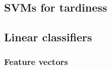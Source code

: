 \documentclass[11pt]{article} %
\begin{document}
%

\subsection{SVMs for tardiness}
\label{sec:svms_tardiness}
  
% 
%  
% 
% 
% 
% 

\subsection{Linear classifiers}
\label{sec:lcs}
% 

\subsubsection{Feature vectors}
\label{sec:feature_vecs}
% 
% 
% 
%  
% 
% 
% 
\end{document}
